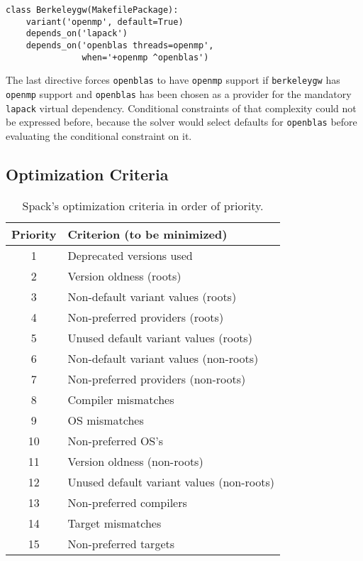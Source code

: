 \begin{verbatim}
class Berkeleygw(MakefilePackage):
    variant('openmp', default=True)
    depends_on('lapack')
    depends_on('openblas threads=openmp',
               when='+openmp ^openblas')
\end{verbatim}

The last directive forces {\tt openblas} to have {\tt openmp} support if
{\tt berkeleygw} has {\tt openmp} support and {\tt openblas} has been chosen as
a provider for the mandatory {\tt lapack} virtual dependency. Conditional constraints
of that complexity could not be expressed before, because the solver would select
defaults for {\tt openblas} before evaluating the conditional constraint on it.

\subsection{Optimization Criteria}

\begin{table}[t]
\centering
\begin{tabular}{| c || l |}
 \hline
 Priority & Criterion (to be minimized) \\
 \hline\hline
 1  & Deprecated versions used \\
 \hline
 2  & Version oldness (roots) \\
 3  & Non-default variant values (roots) \\
 4  & Non-preferred providers (roots) \\
 5  & Unused default variant values (roots) \\
 \hline
 6  & Non-default variant values (non-roots) \\
 7  & Non-preferred providers (non-roots) \\
 \hline
 8  & Compiler mismatches \\
 9  & OS mismatches \\
 10 & Non-preferred OS's \\
 \hline
 11 & Version oldness (non-roots) \\
 12 & Unused default variant values (non-roots) \\
 \hline
 13 & Non-preferred compilers \\
 14 & Target mismatches \\
 15 & Non-preferred targets \\
 \hline
\end{tabular}
\caption{
  Spack's optimization criteria in order of priority.
  \label{table:optimization-criteria}
  \vspace{-1em}
}
\end{table}

